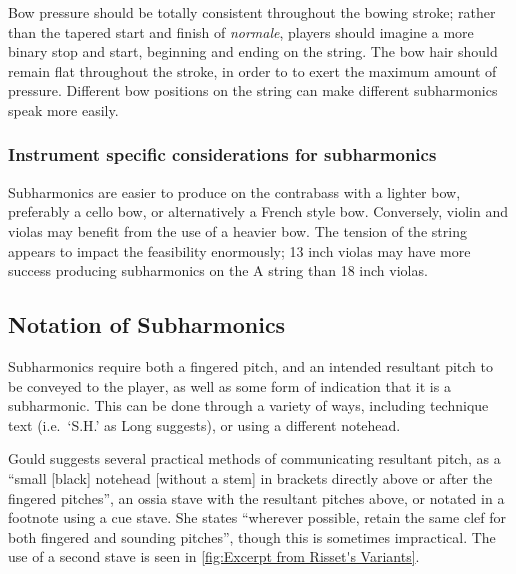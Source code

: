 Bow pressure should be totally consistent throughout the bowing stroke; rather than the tapered start and finish of \emph{normale}, players should imagine a more binary stop and start, beginning and ending on the string.
The bow hair should remain flat throughout the stroke, in order to to exert the maximum amount of pressure.\autocite[]{kimuraHowProduceSubharmonics1999}
Different bow positions on the string can make different subharmonics speak more easily.\autocite[]{kimuraHowProduceSubharmonics1999}

\subsubsection{Instrument specific considerations for subharmonics}
Subharmonics are easier to produce on the contrabass with a lighter bow, preferably a cello bow, or alternatively a French style bow.\autocite[]{longSubharmonics2019}
Conversely, violin and violas may benefit from the use of a heavier bow.\autocite[]{appleseedFeedbackSightreadingSession2019}
The tension of the string appears to impact the feasibility enormously; 13 inch violas may have more success producing subharmonics on the A string than 18 inch violas.\autocite[]{appleseedFeedbackSightreadingSession2019}



\subsection{Notation of Subharmonics}\label{sec:notation-subharmonics}
Subharmonics require both a fingered pitch, and an intended resultant pitch to be conveyed to the player, as well as some form of indication that it is a subharmonic.
This can be done through a variety of ways, including technique text (i.e.\ `S.H.' as Long suggests), or using a different notehead.\autocite[]{longSubharmonics2019}

Gould suggests several practical methods of communicating resultant pitch, as a ``small [black] notehead [without a stem] in brackets directly above or after the fingered pitches'', an ossia stave with the resultant pitches above, or notated in a footnote using a cue stave.\autocite[421]{gouldBars2011}
She states ``wherever possible, retain the same clef for both fingered and sounding pitches'', though this is sometimes impractical.\autocite[422]{gouldBars2011}
The use of a second stave is seen in \autoref{fig:Excerpt from Risset's Variants}.\autocite[It should be noted that Risset's notation omits a fingered pitch, which is not recommended.]{rissetVariants1995}

